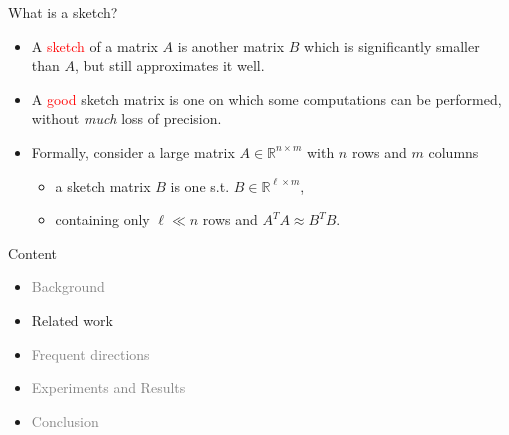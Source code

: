 \documentclass[first=dgreen,second=purple,logo=redque]{aaltoslides}
\begin{document}
\begin{frame}{What is a sketch?}
\begin{itemize}
  \item A \textcolor{red}{sketch} of a matrix $A$ is another matrix $B$ which is significantly
  \textcolor{dgreen}{smaller} than $A$, but still approximates it \textcolor{dgreen}{well}.
  \item A \textcolor{red}{good} sketch matrix is one on which some computations can
  be performed, \textcolor{dgreen}{without} \textit{much} loss of precision.
  \item Formally, consider a large matrix $A \in \mathbb{R}^{n\times m}$ with $n$ rows and $m$
columns
	\begin{itemize}
		\item a sketch matrix $B$ is one s.t. $B \in \mathbb{R}^{\ell \times m}$,
		\item containing only $\ell \ll n$ rows and $A^TA \approx B^TB$.
	\end{itemize}
\end{itemize}
\end{frame}




\begin{frame}{Content}
\begin{itemize}
\item \textcolor{gray}{Background}
\item Related work
\item \textcolor{gray}{Frequent directions}
\item \textcolor{gray}{Experiments and Results}
\item \textcolor{gray}{Conclusion}
\end{itemize}
\end{frame}
\end{document}
